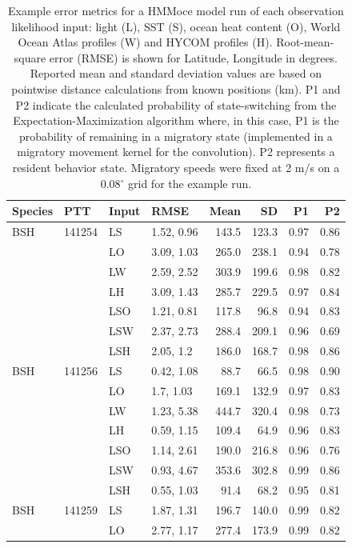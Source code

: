 \begin{table}
\caption{Example error metrics for a HMMoce model run of each observation likelihood input: light (L), SST (S), ocean heat content (O), World Ocean Atlas profiles (W) and HYCOM profiles (H). Root-mean-square error (RMSE) is shown for Latitude, Longitude in degrees. Reported mean and standard deviation values are based on pointwise distance calculations from known positions (km). P1 and P2 indicate the calculated probability of state-switching from the Expectation-Maximization algorithm where, in this case, P1 is the probability of remaining in a migratory state (implemented in a migratory movement kernel for the convolution). P2 represents a resident behavior state. Migratory speeds were fixed at 2 m/s on a 0.08$^{\circ}$ grid for the example run.}
\label{tab:a1t1}
\centering
\begin{tabular}[t]{llllrrrr}
\toprule
\textbf{Species} & \textbf{PTT} & \textbf{Input} & \textbf{RMSE} & \textbf{Mean} & \textbf{SD} & \textbf{P1} & \textbf{P2}\\
\midrule
BSH & 141254 & LS & 1.52, 0.96 & 143.5 & 123.3 & 0.97 & 0.86\\
 &  & LO & 3.09, 1.03 & 265.0 & 238.1 & 0.94 & 0.78\\
 &  & LW & 2.59, 2.52 & 303.9 & 199.6 & 0.98 & 0.82\\
 &  & LH & 3.09, 1.43 & 285.7 & 229.5 & 0.97 & 0.84\\
 &  & LSO & 1.21, 0.81 & 117.8 & 96.8 & 0.94 & 0.83\\
 &  & LSW & 2.37, 2.73 & 288.4 & 209.1 & 0.96 & 0.69\\
 &  & LSH & 2.05, 1.2 & 186.0 & 168.7 & 0.98 & 0.86\\
\addlinespace
BSH & 141256 & LS & 0.42, 1.08 & 88.7 & 66.5 & 0.98 & 0.90\\
 &  & LO & 1.7, 1.03 & 169.1 & 132.9 & 0.97 & 0.83\\
 &  & LW & 1.23, 5.38 & 444.7 & 320.4 & 0.98 & 0.73\\
 &  & LH & 0.59, 1.15 & 109.4 & 64.9 & 0.96 & 0.83\\
 &  & LSO & 1.14, 2.61 & 190.0 & 216.8 & 0.96 & 0.76\\
 &  & LSW & 0.93, 4.67 & 353.6 & 302.8 & 0.99 & 0.86\\
 &  & LSH & 0.55, 1.03 & 91.4 & 68.2 & 0.95 & 0.81\\
\addlinespace
BSH & 141259 & LS & 1.87, 1.31 & 196.7 & 140.0 & 0.99 & 0.82\\
 &  & LO & 2.77, 1.17 & 277.4 & 173.9 & 0.99 & 0.82\\

\end{tabular}
\end{table}
